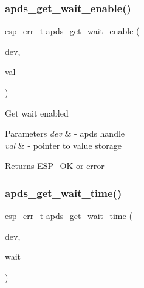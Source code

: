 \subsubsection{\texorpdfstring{apds\+\_\+get\+\_\+wait\+\_\+enable()}{apds\_get\_wait\_enable()}}
{\footnotesize\ttfamily esp\+\_\+err\+\_\+t apds\+\_\+get\+\_\+wait\+\_\+enable (\begin{DoxyParamCaption}\item[{\hyperlink{structAPDS9960__Driver}{A\+P\+D\+S\+\_\+\+D\+EV}}]{dev,  }\item[{\hyperlink{vl53l0x__types_8h_aba7bc1797add20fe3efdf37ced1182c5}{uint8\+\_\+t} $\ast$}]{val }\end{DoxyParamCaption})}




\begin{DoxyItemize}
\item Get wait enabled 
\end{DoxyItemize}


\begin{DoxyParams}{Parameters}
{\em dev} & -\/ apds handle \\
\hline
{\em val} & -\/ pointer to value storage \\
\hline
\end{DoxyParams}
\begin{DoxyReturn}{Returns}
E\+S\+P\+\_\+\+OK or error 
\end{DoxyReturn}
\mbox{\label{group__APDS9960__GeneralFunctions_ga77d198f3395c1f220aa93263592b6b0a}} 
\subsubsection{\texorpdfstring{apds\+\_\+get\+\_\+wait\+\_\+time()}{apds\_get\_wait\_time()}}
{\footnotesize\ttfamily esp\+\_\+err\+\_\+t apds\+\_\+get\+\_\+wait\+\_\+time (\begin{DoxyParamCaption}\item[{\hyperlink{structAPDS9960__Driver}{A\+P\+D\+S\+\_\+\+D\+EV}}]{dev,  }\item[{\hyperlink{vl53l0x__types_8h_aba7bc1797add20fe3efdf37ced1182c5}{uint8\+\_\+t} $\ast$}]{wait }\end{DoxyParamCaption})}




